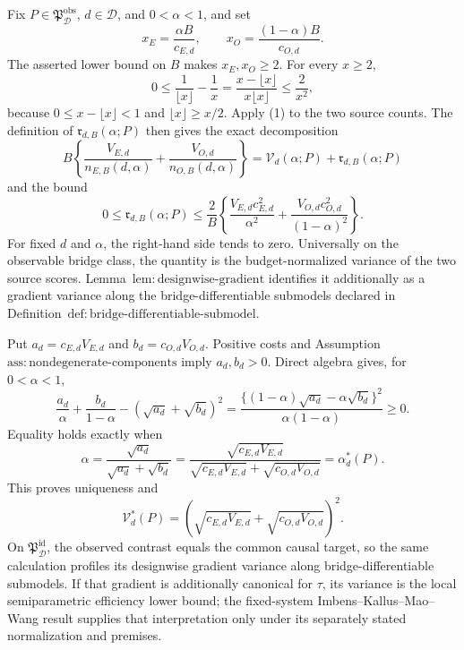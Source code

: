 Fix \(P\in\mathfrak P_{\mathcal D}^{\mathrm{obs}}\), \(d\in\mathcal D\), and \(0<\alpha<1\), and set
\[
 x_E=\frac{\alpha B}{c_{E,d}},
 \qquad
 x_O=\frac{(1-\alpha)B}{c_{O,d}}.
\]
The asserted lower bound on \(B\) makes \(x_E,x_O\ge2\).  For every \(x\ge2\),
\[
 0\le \frac1{\lfloor x\rfloor}-\frac1x
 =\frac{x-\lfloor x\rfloor}{x\lfloor x\rfloor}
 \le\frac2{x^2},                                         \tag{1}
\]
because \(0\le x-\lfloor x\rfloor<1\) and \(\lfloor x\rfloor\ge x/2\).  Apply (1) to the two source counts.  The definition of \(\mathfrak r_{d,B}(\alpha;P)\) then gives the exact decomposition
\[
 B\left\{\frac{V_{E,d}}{n_{E,B}(d,\alpha)}
 +\frac{V_{O,d}}{n_{O,B}(d,\alpha)}\right\}
 =\mathcal V_d(\alpha;P)+\mathfrak r_{d,B}(\alpha;P)
\]
and the bound
\[
 0\le\mathfrak r_{d,B}(\alpha;P)
 \le\frac2B\left\{
 \frac{V_{E,d}c_{E,d}^2}{\alpha^2}
 +\frac{V_{O,d}c_{O,d}^2}{(1-\alpha)^2}\right\}.        \tag{2}
\]
For fixed \(d\) and \(\alpha\), the right-hand side tends to zero.  Universally on the observable bridge class, the quantity is the budget-normalized variance of the two source scores.  Lemma~\(\mathrm{lem{:}designwise\text{-}gradient}\) identifies it additionally as a gradient variance along the bridge-differentiable submodels declared in Definition~\(\mathrm{def{:}bridge\text{-}differentiable\text{-}submodel}\).

Put \(a_d=c_{E,d}V_{E,d}\) and \(b_d=c_{O,d}V_{O,d}\).  Positive costs and Assumption~\(\mathrm{ass{:}nondegenerate\text{-}components}\) imply \(a_d,b_d>0\).  Direct algebra gives, for \(0<\alpha<1\),
\[
 \frac{a_d}{\alpha}+\frac{b_d}{1-\alpha}
 -(\sqrt{a_d}+\sqrt{b_d})^2
 =\frac{\{(1-\alpha)\sqrt{a_d}-\alpha\sqrt{b_d}\}^2}
 {\alpha(1-\alpha)}\ge0.                                 \tag{3}
\]
Equality holds exactly when
\[
 \alpha=\frac{\sqrt{a_d}}{\sqrt{a_d}+\sqrt{b_d}}
 =\frac{\sqrt{c_{E,d}V_{E,d}}}
 {\sqrt{c_{E,d}V_{E,d}}+\sqrt{c_{O,d}V_{O,d}}}
 =\alpha_d^*(P).
\]
This proves uniqueness and
\[
 \mathcal V_d^*(P)
 =\left(\sqrt{c_{E,d}V_{E,d}}+\sqrt{c_{O,d}V_{O,d}}\right)^2.
\]
On \(\mathfrak P_{\mathcal D}^{\mathrm{id}}\), the observed contrast equals the common causal target, so the same calculation profiles its designwise gradient variance along bridge-differentiable submodels.  If that gradient is additionally canonical for \(\tau\), its variance is the local semiparametric efficiency lower bound; the fixed-system Imbens--Kallus--Mao--Wang result supplies that interpretation only under its separately stated normalization and premises.